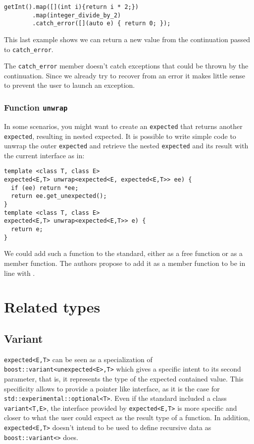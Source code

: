 \documentclass[a4paper,10pt]{article}
\newcommand{\cpp}[1]{\lstinline{#1}}
\begin{document}
\begin{lstlisting}
getInt().map([](int i){return i * 2;})
        .map(integer_divide_by_2)
        .catch_error([](auto e) { return 0; });
\end{lstlisting}
\noindent
This last example shows we can return a new value from the continuation passed to \cpp{catch_error}.
\newline

The \cpp{catch_error} member doesn't catch exceptions that could be thrown by the continuation. Since we already try to recover from an error it makes little sense to prevent the user to launch an exception.

\subsubsection{Function \cpp{unwrap}}

In some scenarios, you might want to create an \cpp{expected} that returns another \cpp{expected}, resulting in nested expected. It is possible to write simple code to unwrap the outer \cpp{expected} and retrieve the nested \cpp{expected} and its result with the current interface as in:

\begin{lstlisting}
template <class T, class E>
expected<E,T> unwrap<expected<E, expected<E,T>> ee) {
  if (ee) return *ee;
  return ee.get_unexpected();
}
template <class T, class E>
expected<E,T> unwrap<expected<E,T>> e) {
  return e;
}
\end{lstlisting}

We could add such a function to the standard, either as a free function or as a member function. The authors propose to add it as a member function to be in line with \cite{ImprovementsAsync}.

\section{Related types}

\subsection{Variant}

\cpp{expected<E,T>} can be seen as a specialization of  \cpp{boost::variant<unexpected<E>,T>} which gives a specific intent to its second parameter, that is, it represents the type of the expected contained value. This specificity allows to provide a pointer like interface, as it is the case for \cpp{std::experimental::optional<T>}. Even if the standard included a class  \cpp{variant<T,E>}, the interface provided by \cpp{expected<E,T>} is more specific and closer to what the user could expect as the result type of a function. In addition, \cpp{expected<E,T>} doesn't intend to be used to define recursive data as \cpp{boost::variant<>} does.
\end{document}
